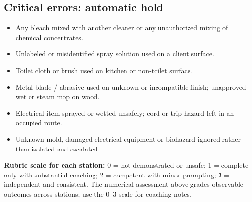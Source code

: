 \documentclass[10pt,letterpaper,oneside]{article}
\begin{document}
\subsection{Critical errors: automatic hold}
\begin{itemize}
\item Any bleach mixed with another cleaner or any unauthorized mixing of chemical concentrates.
\item Unlabeled or misidentified spray solution used on a client surface.
\item Toilet cloth or brush used on kitchen or non-toilet surface.
\item Metal blade / abrasive used on unknown or incompatible finish; unapproved wet or steam mop on wood.
\item Electrical item sprayed or wetted unsafely; cord or trip hazard left in an occupied route.
\item Unknown mold, damaged electrical equipment or biohazard ignored rather than isolated and escalated.
\end{itemize}
\textbf{Rubric scale for each station:} 0 = not demonstrated or unsafe; 1 = complete only with substantial coaching; 2 = competent with minor prompting; 3 = independent and consistent. The numerical assessment above grades observable outcomes across stations; use the 0--3 scale for coaching notes.
\end{document}
